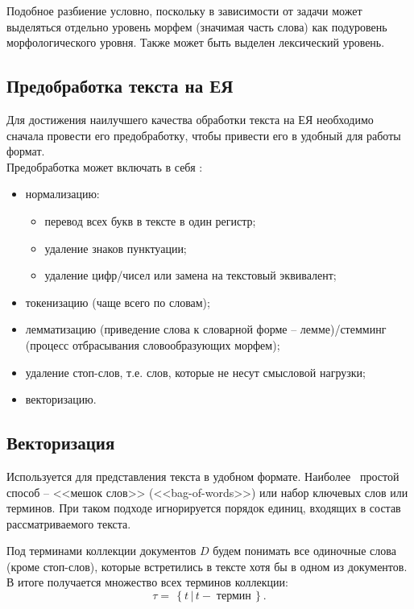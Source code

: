 Подобное разбиение условно, поскольку в зависимости от задачи может выделяться отдельно уровень морфем (значимая часть слова) как подуровень морфологического уровня. Также может быть выделен лексический уровень.

\subsection{Предобработка текста на ЕЯ}\label{sec:before_work}
Для достижения наилучшего качества обработки текста на ЕЯ необходимо сначала провести его предобработку, чтобы привести его в удобный для работы формат. \\
%
Предобработка может включать в себя \cite{evaluation_preprocessing}:
%
\begin{itemize}
	\item нормализацию:
	\begin{itemize}
		\item перевод всех букв в тексте в один регистр;
		
		\item удаление знаков пунктуации;
		
		\item удаление цифр/чисел или замена на текстовый эквивалент;
	\end{itemize}
	
	\item токенизацию (чаще всего по словам);
	
	\item лемматизацию (приведение слова к словарной форме -- лемме)/стемминг (процесс отбрасывания словообразующих морфем);
	
	\item удаление стоп-слов, т.е. слов, которые не несут смысловой нагрузки;
	
	\item векторизацию. \newline
\end{itemize}

\subsection{Векторизация}\label{sec:vect}
Используется для представления текста в удобном формате. Наиболее \, простой способ -- <<мешок слов>> (<<bag-of-words>>) или набор ключевых слов или терминов. При таком подходе игнорируется порядок единиц, входящих в состав рассматриваемого текста.

Под терминами коллекции документов $D$ будем понимать все одиночные слова (кроме стоп-слов), которые встретились в тексте хотя бы  в одном из документов. В итоге получается множество всех терминов коллекции:
\begin{equation}
	\tau = \, \left\lbrace t \, | \, t - \;\text{термин} \, \right\rbrace. 
\end{equation}

